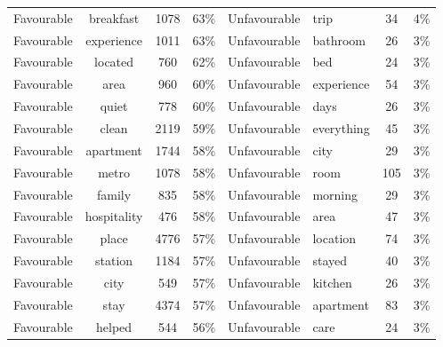 \documentclass[a4paper, 12pt]{article}
\begin{document}
\begin{table}[htbp]
\begin{tabular}{ccccp{5.715em}p{4.715em}cc}
    \multicolumn{1}{p{4.715em}}{Favourable} & \multicolumn{1}{p{4.715em}}{breakfast} & 1078  & 63\%  & Unfavourable & trip  & 34    & 4\% \\
    \multicolumn{1}{p{4.715em}}{Favourable} & \multicolumn{1}{p{4.715em}}{experience} & 1011  & 63\%  & Unfavourable & bathroom & 26    & 3\% \\
    \multicolumn{1}{p{4.715em}}{Favourable} & \multicolumn{1}{p{4.715em}}{located} & 760   & 62\%  & Unfavourable & bed   & 24    & 3\% \\
    \multicolumn{1}{p{4.715em}}{Favourable} & \multicolumn{1}{p{4.715em}}{area} & 960   & 60\%  & Unfavourable & experience & 54    & 3\% \\
    \multicolumn{1}{p{4.715em}}{Favourable} & \multicolumn{1}{p{4.715em}}{quiet} & 778   & 60\%  & Unfavourable & days  & 26    & 3\% \\
    \multicolumn{1}{p{4.715em}}{Favourable} & \multicolumn{1}{p{4.715em}}{clean} & 2119  & 59\%  & Unfavourable & everything & 45    & 3\% \\
    \multicolumn{1}{p{4.715em}}{Favourable} & \multicolumn{1}{p{4.715em}}{apartment} & 1744  & 58\%  & Unfavourable & city  & 29    & 3\% \\
    \multicolumn{1}{p{4.715em}}{Favourable} & \multicolumn{1}{p{4.715em}}{metro} & 1078  & 58\%  & Unfavourable & room  & 105   & 3\% \\
    \multicolumn{1}{p{4.715em}}{Favourable} & \multicolumn{1}{p{4.715em}}{family} & 835   & 58\%  & Unfavourable & morning & 29    & 3\% \\
    \multicolumn{1}{p{4.715em}}{Favourable} & \multicolumn{1}{p{4.715em}}{hospitality} & 476   & 58\%  & Unfavourable & area  & 47    & 3\% \\
    \multicolumn{1}{p{4.715em}}{Favourable} & \multicolumn{1}{p{4.715em}}{place} & 4776  & 57\%  & Unfavourable & location & 74    & 3\% \\
    \multicolumn{1}{p{4.715em}}{Favourable} & \multicolumn{1}{p{4.715em}}{station} & 1184  & 57\%  & Unfavourable & stayed & 40    & 3\% \\
    \multicolumn{1}{p{4.715em}}{Favourable} & \multicolumn{1}{p{4.715em}}{city} & 549   & 57\%  & Unfavourable & kitchen & 26    & 3\% \\
    \multicolumn{1}{p{4.715em}}{Favourable} & \multicolumn{1}{p{4.715em}}{stay} & 4374  & 57\%  & Unfavourable & apartment & 83    & 3\% \\
    \multicolumn{1}{p{4.715em}}{Favourable} & \multicolumn{1}{p{4.715em}}{helped} & 544   & 56\%  & Unfavourable & care  & 24    & 3\% \\

\end{tabular}
\end{table}
\end{document}
